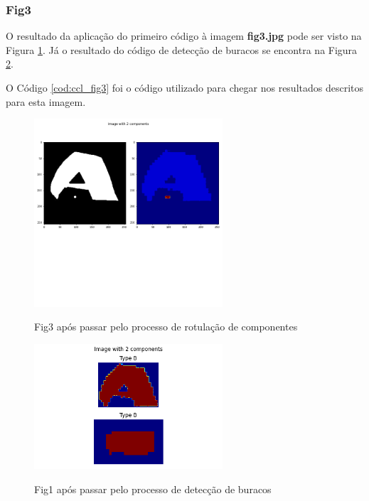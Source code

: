 \documentclass{article}
\begin{document}
\subsubsection{Fig3}
O resultado da aplicação do primeiro código à imagem \textbf{fig3.jpg} pode ser visto na Figura \ref{fig: ccl_fig3}. Já o resultado do código de detecção de buracos se encontra na Figura \ref{fig: hole_fig3}.  

O Código \ref{cod:ccl_fig3} foi o código utilizado para chegar nos resultados descritos para esta imagem.

\begin{figure}[!ht]
	\begin{minipage}[b]{1.0\linewidth}
		\centering
		\centerline{\includegraphics[width=7cm]{Figures/fig3.png}}
		\label{fig: ccl_fig3}
		\centerline{Fig3 após passar pelo processo de rotulação de componentes}\medskip	
	\end{minipage}
\end{figure}

\begin{figure}[!ht]
	\begin{minipage}[b]{1.0\linewidth}
		\centering
		\centerline{\includegraphics[width=7cm]{Figures/ccl_fig3.png}}
		\label{fig: hole_fig3}
		\centerline{Fig1 após passar pelo processo de detecção de buracos}\medskip	
	\end{minipage}
\end{figure}
\end{document}
